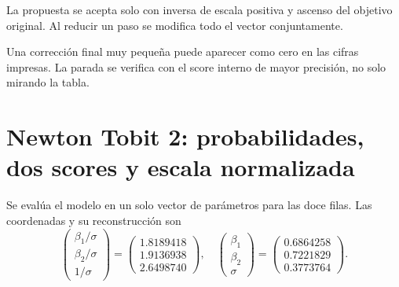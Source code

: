 \documentclass[11pt,a4paper]{article}
\begin{document}
La propuesta se acepta solo con
inversa de escala positiva
y ascenso del objetivo original.
Al reducir un paso se modifica
todo el vector conjuntamente.

Una corrección final muy pequeña
puede aparecer como cero
en las cifras impresas.
La parada se verifica con
el score interno de mayor precisión,
no solo mirando la tabla.

\clearpage
\section{Newton Tobit 2: probabilidades, dos scores y escala normalizada}\label{unidad108}
Se evalúa el modelo en un solo vector
de parámetros para las doce filas.
Las coordenadas y su reconstrucción son
\[
\begin{pmatrix}\beta_1/\sigma\\\beta_2/\sigma\\1/\sigma\end{pmatrix}=\begin{pmatrix}1.8189418\\1.9136938\\2.6498740\end{pmatrix},\quad\begin{pmatrix}\beta_1\\\beta_2\\\sigma\end{pmatrix}=\begin{pmatrix}0.6864258\\0.7221829\\0.3773764\end{pmatrix}.
\]
\end{document}

